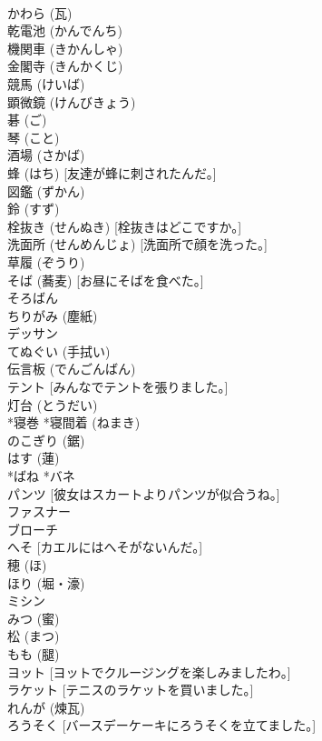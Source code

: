 \documentclass[8pt]{extreport}
\begin{document}
\begin{CJK}{UTF8}{min}
\\	かわら (瓦)
\\	乾電池 (かんでんち)
\\	機関車 (きかんしゃ)
\\	金閣寺 (きんかくじ)
\\	競馬 (けいば)
\\	顕微鏡 (けんびきょう)
\\	碁 (ご)
\\	琴 (こと)
\\	酒場 (さかば)
\\	蜂 (はち) [友達が蜂に刺されたんだ。]
\\	図鑑 (ずかん)
\\	鈴 (すず)
\\	栓抜き (せんぬき) [栓抜きはどこですか。]
\\	洗面所 (せんめんじょ) [洗面所で顔を洗った。]
\\	草履 (ぞうり)
\\	そば (蕎麦) [お昼にそばを食べた。]
\\	そろばん
\\	ちりがみ (塵紙)
\\	デッサン
\\	てぬぐい (手拭い)
\\	伝言板 (でんごんばん)
\\	テント [みんなでテントを張りました。]
\\	灯台 (とうだい)
\\	*寝巻 *寝間着 (ねまき)
\\	のこぎり (鋸)
\\	はす (蓮)
\\	*ばね *バネ
\\	パンツ [彼女はスカートよりパンツが似合うね。]
\\	ファスナー
\\	ブローチ
\\	へそ [カエルにはへそがないんだ。]
\\	穂 (ほ)
\\	ほり (堀・濠)
\\	ミシン
\\	みつ (蜜)
\\	松 (まつ)
\\	もも (腿)
\\	ヨット [ヨットでクルージングを楽しみましたわ。]
\\	ラケット [テニスのラケットを買いました。]
\\	れんが (煉瓦)
\\	ろうそく [バースデーケーキにろうそくを立てました。]

\end{CJK}
\end{document}
